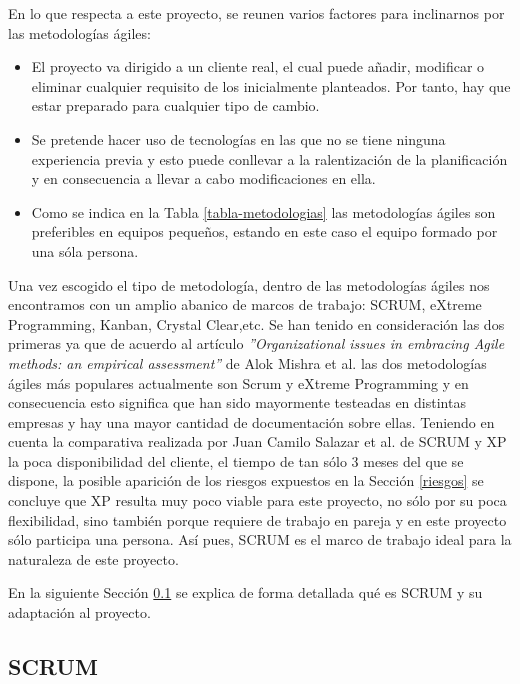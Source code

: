 En lo que respecta a este proyecto, se reunen varios factores para inclinarnos por las metodologías ágiles:
\begin{itemize}
    \item El proyecto va dirigido a un cliente real, el cual puede añadir, modificar o eliminar cualquier requisito de los inicialmente planteados. Por tanto, hay que estar preparado para cualquier tipo de cambio.
    \item Se pretende hacer uso de tecnologías en las que no se tiene ninguna experiencia previa y esto puede conllevar a la ralentización de la planificación y en consecuencia a llevar a cabo modificaciones en ella.
    \item Como se indica en la Tabla \ref{tabla-metodologias} las metodologías ágiles son preferibles en equipos pequeños, estando en este caso el equipo formado por una sóla persona.
\end{itemize}

Una vez escogido el tipo de metodología, dentro de las metodologías ágiles nos encontramos con un amplio abanico de marcos de trabajo: SCRUM, eXtreme Programming, Kanban, Crystal Clear,etc. Se han tenido en consideración las dos primeras ya que de acuerdo al artículo \textit{''Organizational issues in embracing Agile methods: an empirical assessment''} de Alok Mishra et al. \cite{mishra2021organizational} las dos metodologías ágiles más populares actualmente son Scrum y eXtreme Programming y en consecuencia esto significa que han sido mayormente testeadas en distintas empresas y hay una mayor cantidad de documentación sobre ellas. Teniendo en cuenta la comparativa realizada por Juan Camilo Salazar et al. \cite{salazar2018scrum} de SCRUM y XP la poca disponibilidad del cliente, el tiempo de tan sólo 3 meses del que se dispone, la posible aparición de los riesgos expuestos en la Sección \ref{riesgos}  se concluye que XP resulta muy poco viable para este proyecto, no sólo por su poca flexibilidad, sino también porque requiere de trabajo en pareja y en este proyecto sólo participa una persona. Así pues, SCRUM es el marco de trabajo ideal para la naturaleza de este proyecto. \bigskip

En la siguiente Sección \ref{scrum} se explica de forma detallada qué es SCRUM y su adaptación al proyecto.

\subsection{SCRUM} \label{scrum}

